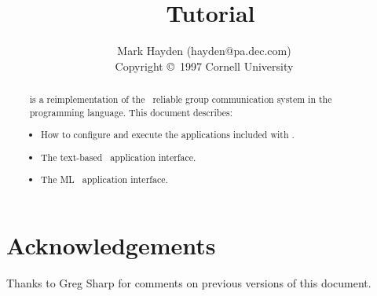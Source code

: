 \documentclass[10pt]{article}
\title{\ensemble\ Tutorial}
\author{Mark Hayden (hayden@pa.dec.com) \\
\small{Copyright \copyright\ 1997 Cornell University}}
\begin{document}
\maketitle

\begin{abstract}
\ensemble\ is a reimplementation of the \horus\ reliable group communication
system in the \caml\ programming language.  This document describes:
\begin{itemize}
\item
How to configure and execute the applications included with \ensemble.
\item
The text-based \ensemble\ application interface.
\item
The ML \ensemble\ application interface.
\end{itemize}
\end{abstract}

\newpage
\tableofcontents
\newpage




%




%

\section*{Acknowledgements}
Thanks to Greg Sharp for comments on previous versions of this document.
\end{document}
